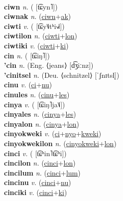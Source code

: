  \label{'ciwafitilipwon} \\
\textbf{ciwn} \textit{n.} ( [t͡ɕyn˥])
 \label{ciwn} \\
\textbf{ciwnak} \textit{n.} (\hyperref[ciwn]{ciwn}+\hyperref[ak]{ak})
 \label{ciwnak} \\
\textbf{ciwti} \textit{v.} ( [t͡ɕy˥˩tʰi˧˩˧])
 \label{ciwti} \\
\textbf{ciwtilon} \textit{n.} (\hyperref[ciwti]{ciwti}+\hyperref[lon]{lon})
 \label{ciwtilon} \\
\textbf{ciwtiki} \textit{v.} (\hyperref[ciwti]{ciwti}+\hyperref[ki]{ki})
 \label{ciwtiki} \\
\textbf{cin} \textit{n.} ( [t͡ɕiŋ˥])
 \label{cin} \\
\textbf{'cin} \textit{n.} (Eng. ⟨jeans⟩ [d͡ʒiːnz])
 \label{'cin} \\
\textbf{'cinitsel} \textit{n.} (Deu. ⟨schnitzel⟩ [ˈʃnɪtsl̩])
 \label{'cinitsel} \\
\textbf{cinu} \textit{v.} (\hyperref[ci]{ci}+\hyperref[nu]{nu})
 \label{cinu} \\
\textbf{cinules} \textit{n.} (\hyperref[cinu]{cinu}+\hyperref[les]{les})
 \label{cinules} \\
\textbf{cinya} \textit{v.} ( [t͡ɕiŋ˥ja˥˩])
 \label{cinya} \\
\textbf{cinyales} \textit{n.} (\hyperref[cinya]{cinya}+\hyperref[les]{les})
 \label{cinyales} \\
\textbf{cinyalon} \textit{n.} (\hyperref[cinya]{cinya}+\hyperref[lon]{lon})
 \label{cinyalon} \\
\textbf{cinyokweki} \textit{v.} (\hyperref[ci]{ci}+\hyperref[nyo]{nyo}+\hyperref[kweki]{kweki})
 \label{cinyokweki} \\
\textbf{cinyokwekilon} \textit{n.} (\hyperref[cinyokweki]{cinyokweki}+\hyperref[lon]{lon})
 \label{cinyokwekilon} \\
\textbf{cinci} \textit{v.} ( [t͡ɕʰin˥t͡ɕʰi])
 \label{cinci} \\
\textbf{cincilon} \textit{n.} (\hyperref[cinci]{cinci}+\hyperref[lon]{lon})
 \label{cincilon} \\
\textbf{cincilum} \textit{n.} (\hyperref[cinci]{cinci}+\hyperref[lum]{lum})
 \label{cincilum} \\
\textbf{cincinu} \textit{v.} (\hyperref[cinci]{cinci}+\hyperref[nu]{nu})
 \label{cincinu} \\
\textbf{cinciki} \textit{v.} (\hyperref[cinci]{cinci}+\hyperref[ki]{ki})
 \label{cinciki} \\
